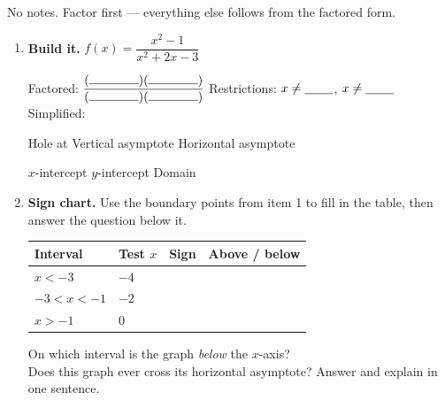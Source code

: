 \documentclass[10pt]{article}
\begin{document}
\namedateperiod

\vspace{0.06in}

No notes. Factor first --- everything else follows from the factored form.

\vspace{0.04in}

\begin{enumerate}[leftmargin=1.8em, itemsep=8pt]
  \item \textbf{Build it.} \; $f(x)=\dfrac{x^2-1}{x^2+2x-3}$

        \vspace{3pt}
        Factored: $\dfrac{(\rule{1.4cm}{0.4pt})(\rule{1.4cm}{0.4pt})}%
        {(\rule{1.4cm}{0.4pt})(\rule{1.4cm}{0.4pt})}$ \quad Restrictions: $x\neq\blank{0.8cm}$,
        $x\neq\blank{0.8cm}$ \quad Simplified: \blank{2.0cm}

        \vspace{3pt}
        Hole at \blank{1.8cm} \quad Vertical asymptote \blank{1.4cm} \quad Horizontal asymptote
        \blank{1.4cm}

        \vspace{3pt}
        $x$-intercept \blank{1.6cm} \quad $y$-intercept \blank{1.6cm} \quad
        Domain \blank{4.4cm}

  \item \textbf{Sign chart.} Use the boundary points from item 1 to fill in the table, then answer the
        question below it.
        \begin{center}
        \renewcommand{\arraystretch}{1.4}
        \begin{tabularx}{0.86\linewidth}{|C{2.4cm}|C{1.5cm}|C{1.6cm}|X|}
        \hline
        \textbf{Interval} & \textbf{Test $x$} & \textbf{Sign} & \textbf{Above / below} \\ \hline
        $x<-3$    & $-4$ & & \\ \hline
        $-3<x<-1$ & $-2$ & & \\ \hline
        $x>-1$    & $0$  & & \\ \hline
        \end{tabularx}
        \end{center}
        \vspace{-4pt}
        On which interval is the graph \emph{below} the $x$-axis? \blank{2.6cm} \\[3pt]
        Does this graph ever cross its horizontal asymptote? Answer and explain in one sentence.
        \writeline


\end{enumerate}
\end{document}
